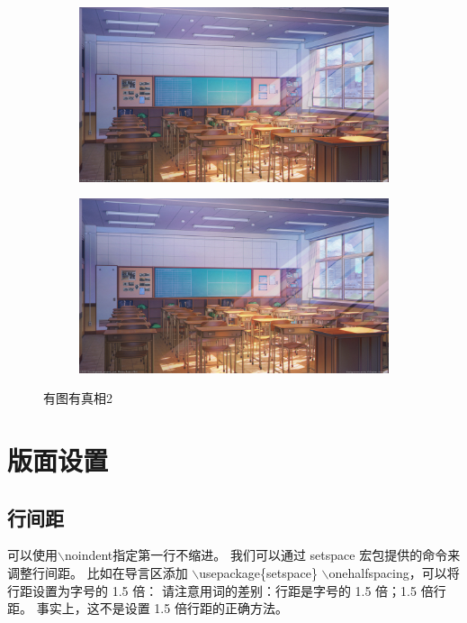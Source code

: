 \documentclass[12pt, a4paper, oneside, UTF8]{ctexart}
\begin{document}
\begin{figure}[htbp]
    \centering
    \begin{subfigure}[b]{0.45\textwidth}
        \includegraphics[width=\textwidth]{classroom.png}
        \label{fig:image1}
    \end{subfigure}
    \hfill
    \begin{subfigure}[b]{0.45\textwidth}
        \includegraphics[width=\textwidth]{classroom.png}
        \label{fig:image2}
    \end{subfigure}
    \caption{有图有真相2}
    \label{fig:twosubfigs004}
\end{figure}
\section{版面设置}
\subsection{行间距}
\noindent 可以使用$\backslash$noindent指定第一行不缩进。
我们可以通过 setspace 宏包提供的命令来调整行间距。
比如在导言区添加
$\backslash$usepackage\{setspace\}
$\backslash$onehalfspacing，可以将行距设置为字号的 1.5 倍：
请注意用词的差别：行距是字号的 1.5 倍；1.5 倍行距。
事实上，这不是设置 1.5 倍行距的正确方法。
\end{document}
